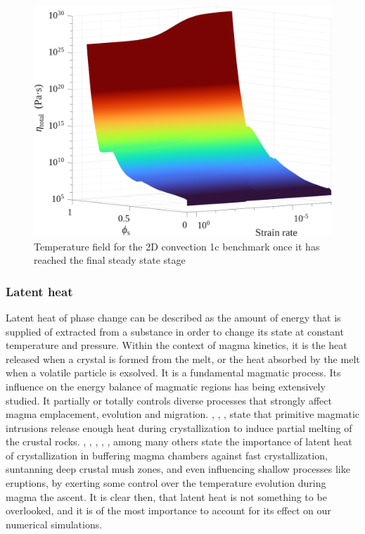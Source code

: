 \begin{figure}
    \centering
    \includegraphics[width=1\linewidth]{img/chapter2/properties/viscosity/non_newt_3D_phi.png}
    \caption{Temperature field for the 2D convection 1c benchmark once it has reached the final steady state stage}
    \label{fig:enter-label}
\end{figure}

\subsubsection{Latent heat}
Latent heat of phase change can be described as the amount of energy that is supplied of extracted from a substance in order to change its state at constant temperature and pressure. Within the context of magma kinetics, it is the heat released when a crystal is formed from the melt, or the heat absorbed by the melt when a volatile particle is exsolved. It is a fundamental magmatic process. Its influence on the energy balance of magmatic regions has being extensively studied. It partially or totally controls diverse processes that strongly affect magma emplacement, evolution and migration. \cite{depaolo1981}, \cite{huppert1988}, \cite{spera2001}, \cite{tavazzani2024} state that primitive magmatic intrusions release enough heat during crystallization to induce partial melting of the crustal rocks. \cite{anne2005}, \cite{blundy2006}, \cite{dufek2010}, \cite{namur2014}, \cite{newcombe2020}, among many others state the importance of latent heat of crystallization in buffering magma chambers against fast crystallization, suntanning deep crustal mush zones, and even influencing shallow processes like eruptions, by exerting some control over the temperature evolution during magma the ascent. It is clear then, that latent heat is not something to be overlooked, and it is of the most importance to account for its effect on our numerical simulations. 

